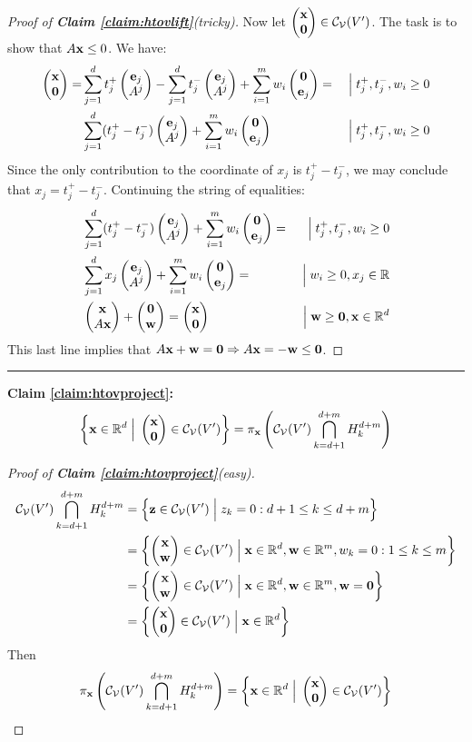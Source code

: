\documentclass[a4,fleqn]{article}
\begin{document}
\begin{proof}[Proof of \textnormal{\textbf{Claim \ref{claim:htovlift}}}(tricky)]
Now let $\svec{\x}{\vec{0}} \in \CV(V')$.  The task is to show that $A\mathbf{x} \leq 0$.  We have:
\begin{align*} 
   \svec{\x}{\vec{0}} = &\sum_{j=1}^{d} t_j^+ \svec{\e_j}{A^j} -
                        \sum_{j=1}^{d} t_j^- \svec{\e_j}{A^j} +
                        \sum_{i=1}^{m} w_i \svec{\vec{0}}{\e_j} =&\Suchthat
                        t_j^+,t_j^-,w_i \geq 0 \\
                        &\sum_{j=1}^{d} (t_j^+-t_j^-) \svec{\e_j}{A^j} +
                        \sum_{i=1}^{m} w_i \svec{\vec{0}}{\e_j} &\Suchthat
                        t_j^+,t_j^-,w_i \geq 0
\end{align*} 
Since the only contribution to the coordinate of $x_j$ is $t_j^+ - t_j^-$, we may conclude that $x_j = t_j^+ - t_j^-$.  Continuing the string of equalities:
\begin{align*} 
                        &\sum_{j=1}^{d} (t_j^+-t_j^-) \svec{\e_j}{A^j} +
                        \sum_{i=1}^{m} w_i \svec{\vec{0}}{\e_j} =&\Suchthat
                        t_j^+,t_j^-,w_i \geq 0 \\
                        &\sum_{j=1}^{d} x_j \svec{\e_j}{A^j} +
                        \sum_{i=1}^{m} w_i \svec{\vec{0}}{\e_j} =&\Suchthat
                        w_i \geq 0, x_j \in \R \\
                        &\svec{\x}{A\x} + \svec{\vec{0}}{\w} = 
                            \svec{\x}{\vec{0}}
                                                                 &\Suchthat
                        \w \geq \vec{0}, \x \in \R^d
\end{align*} 
This last line implies that $A\mathbf{x} + \mathbf{w} = \mathbf{0} \Rightarrow A\mathbf{x} = -\mathbf{w} \leq \mathbf{0}$.
\end{proof}
\bigskip \hrule \bigskip

\textbf{Claim \ref{claim:htovproject}:}
  \[  \left\{ \x \in \R^d \Suchthat 
              \svec{\x}{\vec{0}} \in \CV(V') \right\}
           = \pi_{\x} \left(\CV(V') \bigcap_{k=d+1}^{d+m} H_k^{d+m}\right)\]
\begin{proof}[Proof of \textnormal{\textbf{Claim \ref{claim:htovproject}}}(easy)]
\begin{align*}
  \CV(V') \bigcap_{k=d+1}^{d+m} H_k^{d+m}
    &= \left\{ \z \in \CV(V') \Suchthat z_k = 0 : d+1 \leq k \leq d+m \right\} \\
    &= \left\{ \svec{\x}{\w} \in \CV(V') \Suchthat 
          \x \in \R^d, \w \in \R^m, w_k = 0 : 1 \leq k \leq m \right\} \\
    &= \left\{ \svec{\x}{\w} \in \CV(V') \Suchthat 
          \x \in \R^d, \w \in \R^m, \w = \vec{0} \right\} \\
    &= \left\{ \svec{\x}{\vec{0}} \in \CV(V') \Suchthat \x \in \R^d \right\}
\end{align*}
Then
  \[ \pi_{\x}\left(\CV(V') \bigcap_{k=d+1}^{d+m} H_k^{d+m}\right) 
      = \left\{ \x \in \R^d \Suchthat \svec{\x}{\vec{0}} \in \CV(V') \right\} \]
      
\end{proof}
\end{document}
